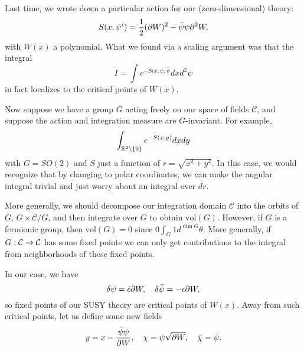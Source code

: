 Last time, we wrote down a particular action for our (zero-dimensional) theory:
\begin{equation*}
    S(x,\psi^i)=\frac{1}{2}(\partial W)^2 - \bar \psi \psi \partial^2 W,
\end{equation*}
with $W(x)$ a polynomial.
What we found via a scaling argument was that the integral
\begin{equation*}
    I=\int e^{-S(x,\psi, \bar \psi} dxd^2 \psi
\end{equation*}
in fact localizes to the critical points of $W(x)$.

Now suppose we have a group $G$ acting freely on our space of fields $\mathcal{C}$, and suppose the action and integration measure are $G$-invariant. For example,
\begin{equation*}
    \int_{\mathbb{R}^2\setminus \{0\}} e^{-S(x,y)} dx dy
\end{equation*}
with $G=SO(2)$ and $S$ just a function of $r=\sqrt{x^2+y^2}$. In this case, we would recognize that by changing to polar coordinates, we can make the angular integral trivial and just worry about an integral over $dr$.

More generally, we should decompose our integration domain $\mathcal{C}$ into the orbits of $G$, $G\times \mathcal{C}/G$, and then integrate over $G$ to obtain $\text{vol}(G)$. However, if $G$ is a fermionic group, then $\text{vol}(G)=0$ since $0\int_G 1 d^{\dim G}\theta$. More generally, if $G:\mathcal{C} \to \mathcal{C}$ has some fixed points we can only get contributions to the integral from neighborhoods of these fixed points.

In our case, we have
\begin{equation}
    \delta \psi = \bar \epsilon \partial W, \quad \delta \bar \psi = -\epsilon \partial W,
\end{equation}
so fixed points of our SUSY theory are critical points of $W(x)$. Away from such critical points, let us define some new fields
\begin{equation}
    y=x - \frac{\bar \psi \psi}{\partial W}, \quad \chi = \psi \sqrt{\partial W},\quad \bar \chi = \bar \psi.
\end{equation}

